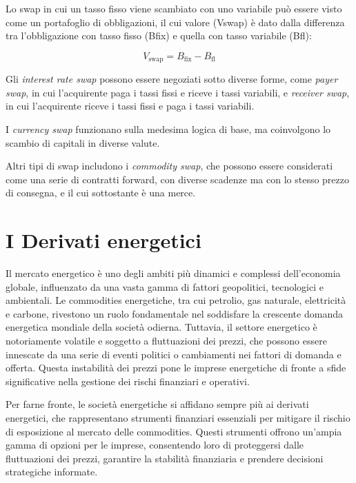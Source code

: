 \documentclass[12pt,a4paper]{report}
\begin{document}
Lo swap in cui un tasso fisso viene scambiato con uno variabile può essere visto come un portafoglio di obbligazioni, il cui valore (Vswap) è dato dalla differenza tra l'obbligazione con tasso fisso (Bfix) e quella con tasso variabile (Bfl):

\begin{equation}
    V_{\text{swap}} = B_{\text{fix}} - B_{\text{fl}}
\end{equation}


Gli \textit{interest rate swap} possono essere negoziati sotto diverse forme, come \textit{payer swap}, in cui l'acquirente paga i tassi fissi e riceve i tassi variabili, e \textit{receiver swap}, in cui l'acquirente riceve i tassi fissi e paga i tassi variabili.

I \textit{currency swap} funzionano sulla medesima logica di base, ma coinvolgono lo scambio di capitali in diverse valute.

Altri tipi di swap includono i \textit{commodity swap}, che possono essere considerati come una serie di contratti forward, con diverse scadenze ma con lo stesso prezzo di consegna, e il cui sottostante è una merce. 



\chapter{I Derivati energetici}



Il mercato energetico è uno degli ambiti più dinamici e complessi dell'economia globale, influenzato da una vasta gamma di fattori geopolitici, tecnologici e ambientali. Le commodities energetiche, tra cui petrolio, gas naturale, elettricità e carbone, rivestono un ruolo fondamentale nel soddisfare la crescente domanda energetica mondiale della società odierna. Tuttavia, il settore energetico è notoriamente volatile e soggetto a fluttuazioni dei prezzi, che possono essere innescate da una serie di eventi politici o cambiamenti nei fattori di domanda e offerta. Questa instabilità dei prezzi pone le imprese energetiche di fronte a sfide significative nella gestione dei rischi finanziari e operativi.

Per farne fronte, le società energetiche si affidano sempre più ai derivati energetici, che rappresentano strumenti finanziari essenziali per mitigare il rischio di esposizione al mercato delle commodities. Questi strumenti offrono un'ampia gamma di opzioni per le imprese, consentendo loro di proteggersi dalle fluttuazioni dei prezzi, garantire la stabilità finanziaria e prendere decisioni strategiche informate. 
\end{document}
